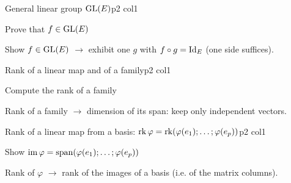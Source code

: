 \documentclass[sheet,noautoquant,noautokw]{neyvia-study}
\begin{document}
\begin{concept}[1.41]{General linear group $\mathrm{GL}(E)$}{p2 col1}
\begin{definition}
\end{definition}
\begin{method}{Prove that $f\in\mathrm{GL}(E)$}
\end{method}
\begin{reflex}
Show $f\in\mathrm{GL}(E)$ \ensuremath{\rightarrow} exhibit one $g$ with $f\circ g=\mathrm{Id}_E$ (one side suffices).
\end{reflex}
\end{concept}
\begin{concept}[1.42]{Rank of a linear map and of a family}{p2 col1}
\begin{definition}
\end{definition}
\begin{method}{Compute the rank of a family}
\end{method}
\begin{reflex}
Rank of a family \ensuremath{\rightarrow} dimension of its span: keep only independent vectors.
\end{reflex}
\end{concept}
\begin{concept}[1.43]{Rank of a linear map from a basis: $\operatorname{rk}\varphi=\operatorname{rk}(\varphi(e_1);\dots;\varphi(e_p))$}{p2 col1}
\begin{definition}
\end{definition}
\begin{method}{Show $\operatorname{im}\varphi=\operatorname{span}(\varphi(e_1);\dots;\varphi(e_p))$}
\end{method}
\begin{reflex}
Rank of $\varphi$ \ensuremath{\rightarrow} rank of the images of a basis (i.e. of the matrix columns).
\end{reflex}
\end{concept}
\end{document}
